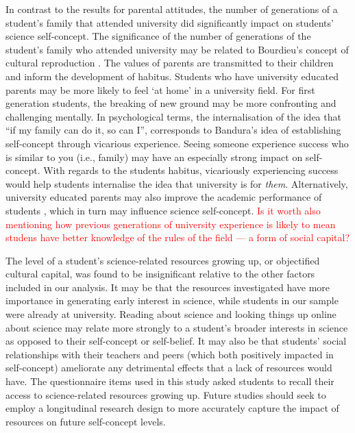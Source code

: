 In contrast to the results for parental attitudes, the number of generations of a student's family that attended university did significantly impact on students' science self-concept. The significance of the number of generations of the student's family who attended university may be related to Bourdieu's concept of cultural reproduction \cite{Dimaggio1982}. The values of parents are transmitted to their children and inform the development of habitus. Students who have university educated parents may be more likely to feel `at home' in a university field. For first generation students, the breaking of new ground may be more confronting and challenging mentally. In psychological terms, the internalisation of the idea that ``if my family can do it, so can I'', corresponds to Bandura's \cite{bandura1986explanatory} idea of establishing self-concept through vicarious experience. Seeing someone experience success who is similar to you (i.e., family) may have an especially strong impact on self-concept. With regards to the students habitus, vicariously experiencing success would help students internalise the idea that university is for \textit{them}. Alternatively, university educated parents may also improve the academic performance of students \cite{paul2011cultural}, which in turn may influence science self-concept. \textcolor{red}{Is it worth also mentioning how previous generations of university experience is likely to mean studens have better knowledge of the rules of the field --- a form of social capital?}

The level of a student's science-related resources growing up, or objectified cultural capital, was found to be insignificant relative to the other factors included in our analysis. It may be that the resources investigated have more importance in generating early interest in science, while students in our sample were already at university. Reading about science and looking things up online about science may relate more strongly to a student's broader interests in science as opposed to their self-concept or self-belief. It may also be that students' social relationships with their teachers and peers (which both positively impacted in self-concept) ameliorate any detrimental effects that a lack of resources would have. The questionnaire items used in this study asked students to recall their access to science-related resources growing up. Future studies should seek to employ a longitudinal research design to more accurately capture the impact of resources on future self-concept levels. 

